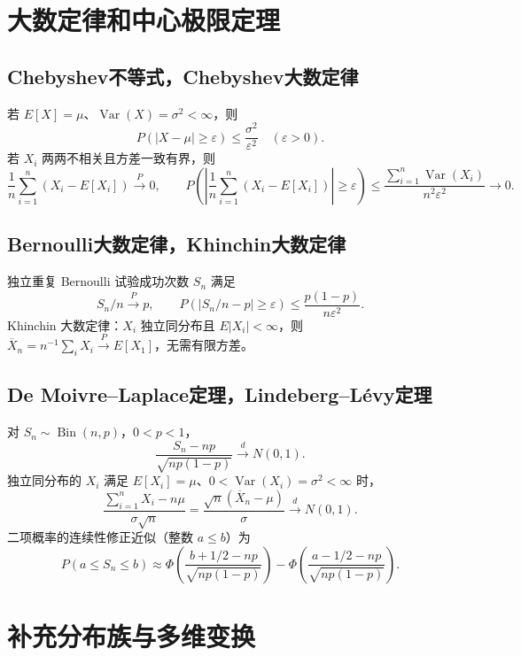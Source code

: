 \documentclass[../main.tex]{subfiles}
\begin{document}
\section{大数定律和中心极限定理}
\subsection{Chebyshev不等式，Chebyshev大数定律}
若 $E[X]=\mu$、$\operatorname{Var}(X)=\sigma^2<\infty$，则
\[
P(|X-\mu|\ge\varepsilon)\le\frac{\sigma^2}{\varepsilon^2}\quad(\varepsilon>0).
\]
若 $X_i$ 两两不相关且方差一致有界，则
\[
\frac1n\sum_{i=1}^n(X_i-E[X_i])\xrightarrow{P}0,\qquad
P\!\left(\left|\frac1n\sum_{i=1}^n(X_i-E[X_i])\right|\ge\varepsilon\right)
\le\frac{\sum_{i=1}^n\operatorname{Var}(X_i)}{n^2\varepsilon^2}\to0.
\]
\subsection{Bernoulli大数定律，Khinchin大数定律}
独立重复 Bernoulli 试验成功次数 $S_n$ 满足
\[
S_n/n\xrightarrow{P}p,\qquad
P(|S_n/n-p|\ge\varepsilon)\le\frac{p(1-p)}{n\varepsilon^2}.
\]
Khinchin 大数定律：$X_i$ 独立同分布且 $E|X_i|<\infty$，则 $\overline X_n=n^{-1}\sum_iX_i\xrightarrow{P}E[X_1]$，无需有限方差。
\subsection{De Moivre--Laplace定理，Lindeberg--Lévy定理}
对 $S_n\sim\operatorname{Bin}(n,p)$，$0<p<1$，
\[
\frac{S_n-np}{\sqrt{np(1-p)}}\xrightarrow{d}N(0,1).
\]
独立同分布的 $X_i$ 满足 $E[X_i]=\mu$、$0<\operatorname{Var}(X_i)=\sigma^2<\infty$ 时，
\[
\frac{\sum_{i=1}^nX_i-n\mu}{\sigma\sqrt n}
=\frac{\sqrt n(\overline X_n-\mu)}\sigma\xrightarrow{d}N(0,1).
\]
二项概率的连续性修正近似（整数 $a\le b$）为
\[
P(a\le S_n\le b)\approx
\Phi\!\left(\frac{b+1/2-np}{\sqrt{np(1-p)}}\right)
-\Phi\!\left(\frac{a-1/2-np}{\sqrt{np(1-p)}}\right).
\]
\section{补充分布族与多维变换}
\end{document}
